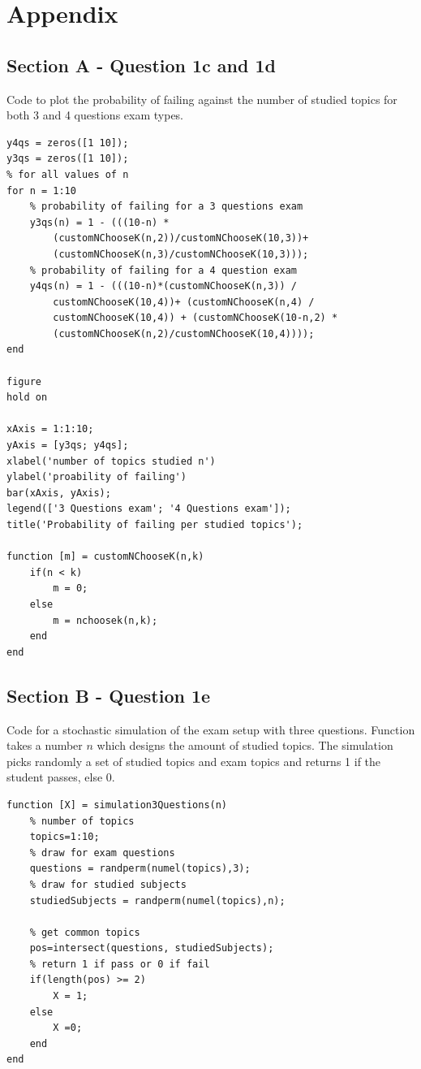 \documentclass[10pt]{article}
\begin{document}
\section*{Appendix}
\subsection*{Section A - Question 1c and 1d}
Code to plot the probability of failing against the number of 
studied topics for both 3 and 4 questions exam types. \\
\begin{lstlisting}
y4qs = zeros([1 10]);
y3qs = zeros([1 10]);
% for all values of n
for n = 1:10
    % probability of failing for a 3 questions exam
    y3qs(n) = 1 - (((10-n) *
        (customNChooseK(n,2))/customNChooseK(10,3))+
        (customNChooseK(n,3)/customNChooseK(10,3)));
    % probability of failing for a 4 question exam
    y4qs(n) = 1 - (((10-n)*(customNChooseK(n,3)) /
        customNChooseK(10,4))+ (customNChooseK(n,4) /
        customNChooseK(10,4)) + (customNChooseK(10-n,2) *
        (customNChooseK(n,2)/customNChooseK(10,4))));
end

figure
hold on

xAxis = 1:1:10;
yAxis = [y3qs; y4qs];
xlabel('number of topics studied n')
ylabel('proability of failing')
bar(xAxis, yAxis);
legend(['3 Questions exam'; '4 Questions exam']);
title('Probability of failing per studied topics');

function [m] = customNChooseK(n,k)
    if(n < k)
        m = 0;
    else
        m = nchoosek(n,k); 
    end
end
\end{lstlisting}


\subsection*{Section B - Question 1e}
Code for a stochastic simulation of the exam setup with three questions.
Function takes a number $ n $ which designs the amount of studied topics.
The simulation picks randomly a set of studied topics and exam topics 
and returns 1 if the student passes, else 0.
\begin{lstlisting}
function [X] = simulation3Questions(n)
    % number of topics
    topics=1:10;
    % draw for exam questions
    questions = randperm(numel(topics),3);
    % draw for studied subjects
    studiedSubjects = randperm(numel(topics),n); 
    
    % get common topics
    pos=intersect(questions, studiedSubjects);
    % return 1 if pass or 0 if fail
    if(length(pos) >= 2)
        X = 1; 
    else 
        X =0;
    end
end    
\end{lstlisting}
\end{document}

